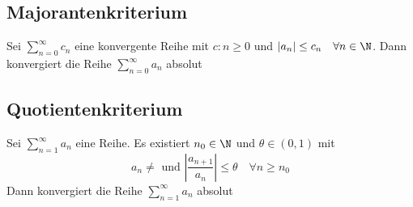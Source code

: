 	\subsection{Majorantenkriterium}
		\begin{Satz} [ ]
			Sei $\displaystyle\sum_{n=0}^\infty c_n$ eine konvergente Reihe mit $c:n \geq 0$ und $|a_n|\leq c_n \quad\forall n\in\N$. Dann konvergiert die Reihe $\displaystyle\sum_{n=0}^\infty a_n$ absolut
		\end{Satz}
	\subsection{Quotientenkriterium}
		\begin{Satz} [ ]
			Sei $\displaystyle\sum_{n=1}^\infty a_n$ eine Reihe. Es existiert $n_0\in\N$ und  $\theta\in(0, 1)$ mit
			$$
				a_n\not = \text{ und } |\frac{a_{n+1}}{a_n}|\leq \theta \quad \forall n\geq n_0
			$$
			Dann konvergiert die Reihe $\displaystyle\sum_{n=1}^\infty a_n$ absolut
		\end{Satz}
		
		
		
		